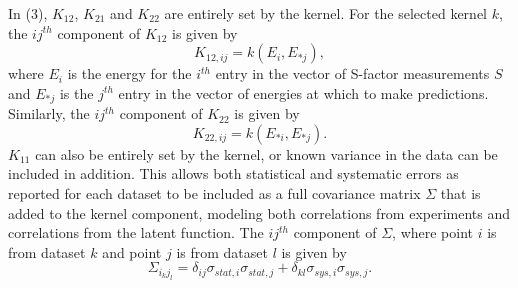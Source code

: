 \documentclass[%
 reprint,
superscriptaddress,
nofootinbib,
 amsmath,amssymb,
 aps,
 pra,
]{revtex4-2}
\begin{document}
In (3), $K_{12}$, $K_{21}$ and $K_{22}$ are entirely set by the kernel. For the selected kernel $k$, the $ij^{th}$ component of $K_{12}$ is given by
\begin{equation}
	K_{12,ij} = k(E_i, E_{*j}), \nonumber
\end{equation}
where $E_i$ is the energy for the $i^{th}$ entry in the vector of S-factor measurements $S$ and $E_{*j}$ is the $j^{th}$ entry in the vector of energies at which to make predictions. Similarly, the $ij^{th}$ component of $K_{22}$ is given by
\begin{equation}
	K_{22,ij} = k(E_{*i}, E_{*j}). \nonumber
\end{equation}
$K_{11}$ can also be entirely set by the kernel, or known variance in the data can be included in addition. This allows both statistical and systematic errors as reported for each dataset to be included as a full covariance matrix $\Sigma$ that is added to the kernel component, modeling both correlations from experiments and correlations from the latent function. The $ij^{th}$ component of $\Sigma$, where point $i$ is from dataset $k$ and point $j$ is from dataset $l$ is given by
\begin{equation}
	\Sigma_{i_k j_l} = \delta_{ij} \sigma_{stat,i} \sigma_{stat,j} + \delta_{kl} \sigma_{sys,i} \sigma_{sys,j}. \nonumber
\end{equation}
\end{document}
